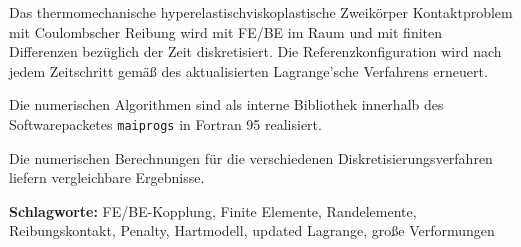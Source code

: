 Das thermomechanische  hyperelastischviskoplastische Zweikörper Kontaktproblem mit Coulombscher Reibung wird mit FE/BE im Raum und mit finiten Differenzen bezüglich der Zeit diskretisiert. Die Referenzkonfiguration wird nach  jedem Zeitschritt gemäß des aktualisierten Lagrange'sche Verfahrens erneuert. 

Die numerischen  Algorithmen sind als interne Bibliothek innerhalb des Softwarepacketes {\tt maiprogs} in Fortran 95 realisiert.


Die numerischen Berechnungen für die verschiedenen Diskretisierungsverfahren liefern vergleichbare Ergebnisse.


\textbf{Schlagworte:} FE/BE-Kopplung,  Finite Elemente, Randelemente, Reibungskontakt, Penalty, Hartmodell, updated Lagrange, gro\ss{}e Verformungen
\vspace*{-2.6mm}
